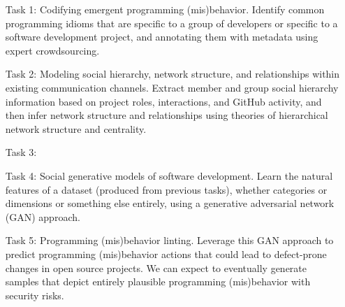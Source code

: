 \begin{itemize}
  \addtolength{\itemindent}{3.9mm}
  \item[Task 1:] Codifying emergent programming (mis)behavior. Identify common
  programming idioms that are specific to a group of developers or specific to a
  software development project, and annotating them with metadata using expert
  crowdsourcing.
  \item[Task 2:] Modeling social hierarchy, network structure, and relationships
  within existing communication channels. Extract member and group social
  hierarchy information based on project roles, interactions, and GitHub
  activity, and then infer network structure and relationships using theories of
  hierarchical network structure and centrality.
  \item[Task 3:] 
  \item[Task 4:] Social generative models of software development. Learn the
  natural features of a dataset (produced from previous tasks), whether
  categories or dimensions or something else entirely, using a generative
  adversarial network (GAN) approach.
  \item[Task 5:] Programming (mis)behavior linting. Leverage this GAN approach
  to predict programming (mis)behavior actions that could lead to defect-prone
  changes in open source projects. We can expect to eventually generate samples
  that depict entirely plausible programming (mis)behavior with security risks.
\end{itemize}

